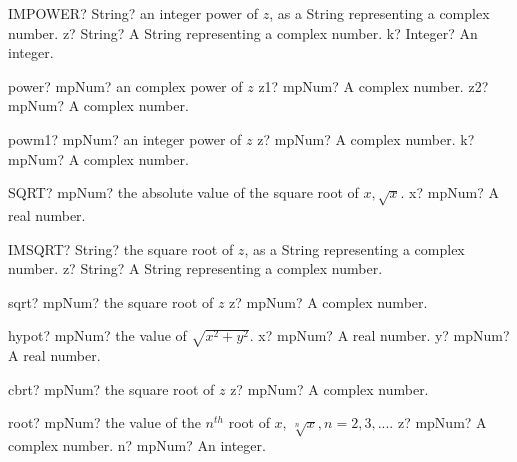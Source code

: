 \documentclass[12pt,a4paper,openany]{book}
\begin{document}
\begin{mpFunctionsExtract}
\mpWorksheetFunctionTwoNotImplemented
{IMPOWER? String? an integer power of $z$, as a String representing a complex number.}
{z? String? A String representing a complex number.}
{k? Integer? An integer.}
\end{mpFunctionsExtract}

\begin{mpFunctionsExtract}
\mpFunctionTwo
{power? mpNum? an complex power of $z$}
{z1? mpNum? A complex number.}
{z2? mpNum? A complex number.}
\end{mpFunctionsExtract}

\begin{mpFunctionsExtract}
\mpFunctionTwo
{powm1? mpNum? an integer power of $z$}
{z? mpNum? A complex number.}
{k? mpNum?  A complex number.}
\end{mpFunctionsExtract}

\begin{mpFunctionsExtract}
\mpWorksheetFunctionOneNotImplemented
{SQRT? mpNum? the absolute value of the square root of $x, \sqrt{x}$.}
{x? mpNum? A real number.}
\end{mpFunctionsExtract}

\begin{mpFunctionsExtract}
\mpWorksheetFunctionOneNotImplemented
{IMSQRT? String? the square root of $z$, as a String representing a complex number.}
{z? String? A String representing a complex number.}
\end{mpFunctionsExtract}

\begin{mpFunctionsExtract}
\mpFunctionOne
{sqrt? mpNum? the square root of $z$}
{z? mpNum? A complex number.}
\end{mpFunctionsExtract}

\begin{mpFunctionsExtract}
\mpFunctionTwo
{hypot? mpNum? the value of $\sqrt{x^2+y^2}$.}
{x? mpNum? A real number.}
{y? mpNum? A real number.}
\end{mpFunctionsExtract}

\begin{mpFunctionsExtract}
\mpFunctionOne
{cbrt? mpNum? the square root of $z$}
{z? mpNum? A complex number.}
\end{mpFunctionsExtract}

\begin{mpFunctionsExtract}
\mpFunctionTwo
{root? mpNum? the value of the $n^{th}$ root of $x$, $\sqrt[n]{x}, n=2,3,...$.}
{z? mpNum? A complex number.}
{n? mpNum? An integer.}
\end{mpFunctionsExtract}
\end{document}
